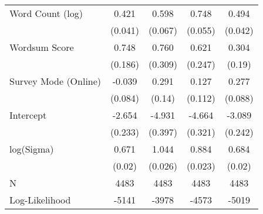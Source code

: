 \begin{table}[ht]
\begin{tabular}{lcccc}
  Word Count (log) &  0.421 &  0.598 &  0.748 &  0.494 \\ 
   & (0.041) & (0.067) & (0.055) & (0.042) \\ 
  Wordsum Score &  0.748 &  0.760 &  0.621 &  0.304 \\ 
   & (0.186) & (0.309) & (0.247) & (0.19) \\ 
  Survey Mode (Online) & -0.039 &  0.291 &  0.127 &  0.277 \\ 
   & (0.084) & (0.14) & (0.112) & (0.088) \\ 
  Intercept & -2.654 & -4.931 & -4.664 & -3.089 \\ 
   & (0.233) & (0.397) & (0.321) & (0.242) \\ 
  log(Sigma) &  0.671 &  1.044 &  0.884 &  0.684 \\ 
   & (0.02) & (0.026) & (0.023) & (0.02) \\ 
   \hline
N & 4483 & 4483 & 4483 & 4483 \\ 
  Log-Likelihood & -5141 & -3978 & -4573 & -5019 \\ 
   \hline
\end{tabular}
\endgroup
\end{table}

